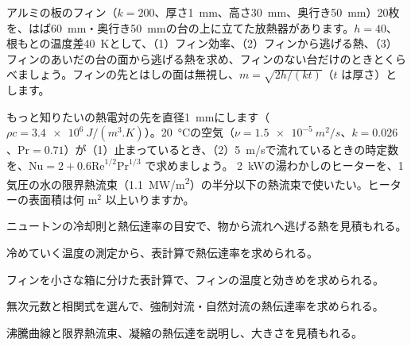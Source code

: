\bkproblem アルミの板のフィン（$k=200$、厚さ\qty{1}{mm}、高さ\qty{30}{mm}、奥行き\qty{50}{mm}）20枚を、はば\qty{60}{mm}・奥行き\qty{50}{mm}の台の上に立てた放熱器があります。$h=40$、根もとの温度差\qty{40}{K}として、（1）フィン効率、（2）フィンから逃げる熱、（3）フィンのあいだの台の面から逃げる熱を求め、フィンのない台だけのときとくらべましょう。フィンの先とはしの面は無視し、$m=\sqrt{2h/(kt)}$（$t$ は厚さ）とします。

\bkproblem もっと知りたいの熱電対の先を直径\qty{1}{mm}にします（$\rho c=\qty{3.4e6}{J/(m^3.K)}$）。\qty{20}{\celsius}の空気（$\nu=\qty{1.5e-5}{m^2/s}$、$k=0.026$、$\mathrm{Pr}=0.71$）が（1）止まっているとき、（2）\qty{5}{m/s}で流れているときの時定数を、$\mathrm{Nu}=2+0.6\mathrm{Re}^{1/2}\mathrm{Pr}^{1/3}$ で求めましょう。
\bkproblem \qty{2}{kW}の湯わかしのヒーターを、1気圧の水の限界熱流束（\qty{1.1}{MW/m^2}）の半分以下の熱流束で使いたい。ヒーターの表面積は何 m$^2$ 以上いりますか。

\begin{furikaeri}
\begin{checklist}
\item ニュートンの冷却則と熱伝達率の目安で、物から流れへ逃げる熱を見積もれる。
\item 冷めていく温度の測定から、表計算で熱伝達率を求められる。
\item フィンを小さな箱に分けた表計算で、フィンの温度と効きめを求められる。
\item 無次元数と相関式を選んで、強制対流・自然対流の熱伝達率を求められる。
\item 沸騰曲線と限界熱流束、凝縮の熱伝達を説明し、大きさを見積もれる。
\end{checklist}
\end{furikaeri}
